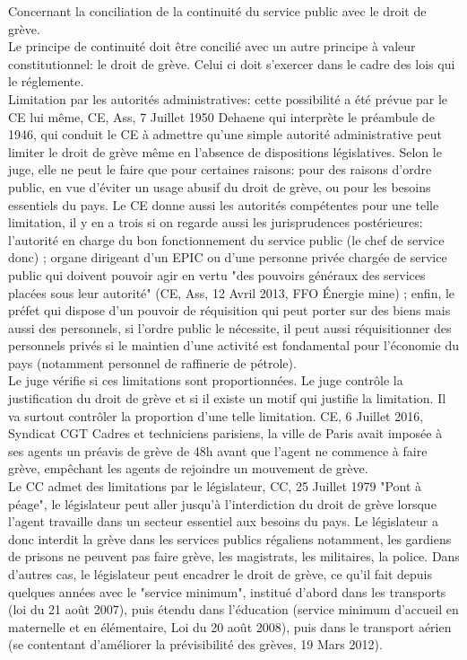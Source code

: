 \documentclass[10pt, a4paper, openany]{book}
\begin{document}
Concernant la conciliation de la continuité du service public avec le droit de grève. \\
Le principe de continuité doit être concilié avec un autre principe à valeur constitutionnel: le droit de grève. Celui ci doit s'exercer dans le cadre des lois qui le réglemente. \\
Limitation par les autorités administratives: cette possibilité a été prévue par le CE lui même, CE, Ass, 7 Juillet 1950 Dehaene qui interprète le préambule de 1946, qui conduit le CE à admettre qu'une simple autorité administrative peut limiter le droit de grève même en l'absence de dispositions législatives. Selon le juge, elle ne peut le faire que pour certaines raisons: pour des raisons d'ordre public, en vue d'éviter un usage abusif du droit de grève, ou pour les besoins essentiels du pays. Le CE donne aussi les autorités compétentes pour une telle limitation, il y en a trois si on regarde aussi les jurisprudences postérieures: l'autorité en charge du bon fonctionnement du service public (le chef de service donc) ; organe dirigeant d'un EPIC ou d'une personne privée chargée de service public qui doivent pouvoir agir en vertu "des pouvoirs généraux des services placées sous leur autorité" (CE, Ass, 12 Avril 2013, FFO Énergie mine) ; enfin, le préfet qui dispose d'un pouvoir de réquisition qui peut porter sur des biens mais aussi des personnels, si l'ordre public le nécessite, il peut aussi réquisitionner des personnels privés si le maintien d'une activité est fondamental pour l'économie du pays (notamment personnel de raffinerie de pétrole). \\
Le juge vérifie si ces limitations sont proportionnées. Le juge contrôle la justification du droit de grève et si il existe un motif qui justifie la limitation. Il va surtout contrôler la proportion d'une telle limitation. CE, 6 Juillet 2016, Syndicat CGT Cadres et techniciens parisiens, la ville de Paris avait imposée à ses agents un préavis de grève de 48h avant que l'agent ne commence à faire grève, empêchant les agents de rejoindre un mouvement de grève. \\
Le CC admet des limitations par le législateur, CC, 25 Juillet 1979 "Pont à péage", le législateur peut aller jusqu'à l'interdiction du droit de grève lorsque l'agent travaille dans un secteur essentiel aux besoins du pays. Le législateur a donc interdit la grève dans les services publics régaliens notamment, les gardiens de prisons ne peuvent pas faire grève, les magistrats, les militaires, la police. Dans d'autres cas, le législateur peut encadrer le droit de grève, ce qu'il fait depuis quelques années avec le "service minimum", institué d'abord dans les transports (loi du 21 août 2007), puis étendu dans l'éducation (service minimum d'accueil en maternelle et en élémentaire, Loi du 20 août 2008), puis dans le transport aérien (se contentant d'améliorer la prévisibilité des grèves, 19 Mars 2012). 
\end{document}
